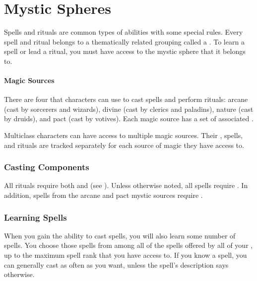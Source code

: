\chapter{Mystic Spheres}\label{Mystic Spheres}

  Spells and rituals are common types of \magical abilities with some special rules.
  Every spell and ritual belongs to a thematically related grouping called a .
  To learn a spell or lead a ritual, you must have access to the mystic sphere that it belongs to.

  \subsubsection{Magic Sources}
    There are four  that characters can use to cast spells and perform rituals: arcane (cast by sorcerers and wizards), divine (cast by clerics and paladins), nature (cast by druids), and pact (cast by votives).
    Each magic source has a set of associated .

    Multiclass characters can have access to multiple magic sources.
    Their , spells, and rituals are tracked separately for each source of magic they have access to.

  \subsection{Casting Components}\label{Casting Components}
    All rituals require both  and  (see ).
    Unless otherwise noted, all spells require .
    In addition, spells from the arcane and pact mystic sources require .

  \subsection{Learning Spells}
    When you gain the ability to cast spells, you will also learn some number of spells.
    You choose those spells from among all of the spells offered by all of your , up to the maximum spell rank that you have access to.
    If you know a spell, you can generally cast as often as you want, unless the spell's description says otherwise.

